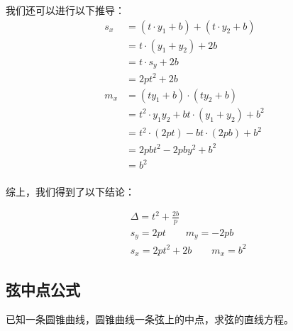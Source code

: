 \documentclass[UTF8]{ctexart}
\begin{document}
    我们还可以进行以下推导：
    \begin{align}
        s_x
        &=(t\cdot y_1+b)+(t\cdot y_2+b)\\[3mm]
        &=t\cdot(y_1+y_2)+2b\\[3mm]
        &=t\cdot s_y+2b\\[3mm]
        &=2pt^2+2b\\[6mm]
        m_x
        &=(ty_1+b)\cdot(ty_2+b)\\[3mm]
        &=t^2\cdot y_1y_2+bt\cdot(y_1+y_2)+b^2\\[3mm]
        &=t^2\cdot(2pt)-bt\cdot(2pb)+b^2\\[3mm]
        &=2pbt^2-2pby^2+b^2\\[3mm]
        &=b^2
    \end{align}\\
    综上，我们得到了以下结论：
    \begin{large}
        \begin{align*}
            &\Delta=t^2+\frac{2b}{p}\\[4mm]
            &s_y=2pt\qquad
            m_y=-2pb\\[6mm]
            &s_x=2pt^2+2b\qquad
            m_x=b^2
        \end{align*}
    \end{large}

\newpage

\subsection{弦中点公式}
    已知一条圆锥曲线，圆锥曲线一条弦上的中点，求弦的直线方程。
\end{document}
